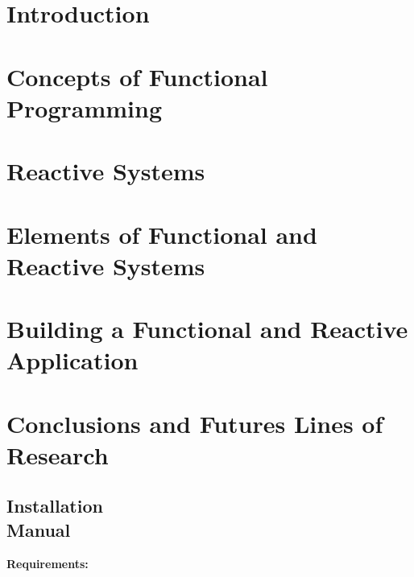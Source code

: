 \documentclass[12pt, a4paper, twoside]{article}
\begin{document}


\newpage



\tableofcontents

\section{Introduction}


\section{Concepts of Functional Programming}


\section{Reactive Systems}


\section{Elements of Functional and Reactive Systems}


\section{Building a Functional and Reactive Application}


\section{Conclusions and Futures Lines of Research}


\printbibliography

\newpage

\begin{umaappendices}
  \section{Installation \\ Manual}

  \textbf{\large{Requirements:}}

  \blindtext

\end{umaappendices}
\end{document}
